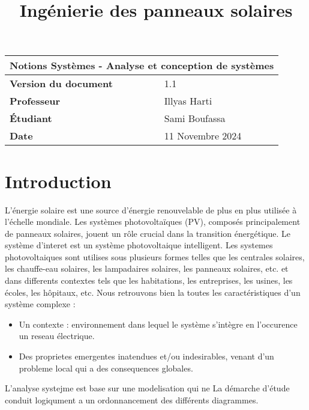 \documentclass{article}
\title{Ingénierie des panneaux solaires}
\author{}
\date{\vspace{-5ex}}
\begin{document}
\maketitle

\begin{center}
    \begin{tabular}{|l|l|}
        \hline
        \multicolumn{2}{|c|}{\textbf{Notions Systèmes - Analyse et conception de systèmes}} \\
        \hline
        \textbf{Version du document} & 1.1 \\
        \hline
        \textbf{Professeur} & Illyas Harti\\
        \hline
        \textbf{Étudiant} & Sami Boufassa\\
                            
        \hline
        \textbf{Date} & 11 Novembre 2024 \\
        \hline
    \end{tabular}
\end{center}

\tableofcontents

\newpage

\section{Introduction}
L'énergie solaire est une source d'énergie renouvelable de plus en plus utilisée à l'échelle mondiale. Les systèmes photovoltaïques (PV), composés principalement de panneaux solaires, jouent un rôle crucial dans la transition énergétique.
Le système d'interet est un système photovoltaique intelligent. Les systemes photovoltaiques sont utilises sous plusieurs formes telles que les centrales solaires, les chauffe-eau solaires, les lampadaires solaires, les panneaux solaires, etc. et dans differents contextes tels que les habitations, les entreprises, les usines, les écoles, les hôpitaux, etc.  
Nous retrouvons bien la toutes les caractéristiques d'un système complexe : 
\begin{itemize}
    \item Un contexte : environnement dans lequel le système s'intègre en l'occurence un reseau électrique. 
    \item Des proprietes emergentes inatendues et/ou indesirables, venant d'un probleme local qui a des consequences globales.

\end{itemize} 

L'analyse systejme est base sur une modelisation qui ne 
La démarche d'étude conduit logiqument a un ordonnancement des différents diagrammes.
\end{document}

